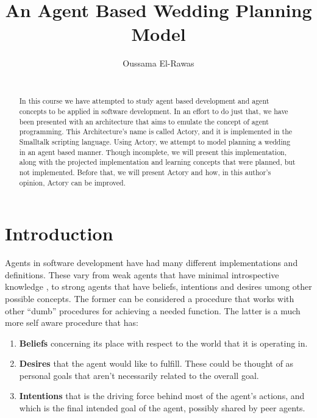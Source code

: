 \documentclass{sig-alternate}
\newcommand{\be}{\begin{smallenum}}
\newcommand{\ee}{\end{smallenum}}
\newenvironment{smallenum}
 {\setlength{\topsep}{0pt}
  \setlength{\partopsep}{0pt}
  \setlength{\parskip}{0pt}
  \begin{enumerate}
  \setlength{\leftmargin}{.2in}
  \setlength{\parsep}{0pt}
  \setlength{\parskip}{0pt}
  \setlength{\itemsep}{0pt}}
 {\end{enumerate}}
\begin{document}
\conferenceinfo{~}{~}

\title{An Agent Based Wedding Planning Model}


\author{
\alignauthor
Oussama El-Rawas\\
       \\
}

\maketitle
\begin{abstract}
In this course we have attempted to study agent based development and agent concepts to be applied in software development. In an effort to do just that, we have been presented with an architecture that aims to emulate the concept of agent programming. This Architecture's name is called Actory, and it is implemented in the Smalltalk scripting language. Using Actory, we attempt to model planning a wedding in an agent based manner. Though incomplete, we will present this implementation, along with the projected implementation and learning concepts that were planned, but not implemented. Before that, we will present Actory and how, in this author's opinion, Actory can be improved.
\end{abstract}


\section{Introduction}
Agents in software development have had many different implementations and definitions. These vary from weak agents that have minimal introspective knowledge \cite{woolridge95}, to strong agents \cite{rao95} that have beliefs, intentions and desires umong other possible concepts. The former can be considered a procedure that works with other ``dumb'' procedures for achieving a needed function. The latter is a much more self aware procedure that has:

\be
\item \textbf{Beliefs} concerning its place with respect to the world that it is operating in.
\item \textbf{Desires} that the agent would like to fulfill. These could be thought of as personal goals that aren't necessarily related to the overall goal.
\item \textbf{Intentions} that is the driving force behind most of the agent's actions, and which is the final intended goal of the agent, possibly shared by peer agents.
\ee
\end{document}
